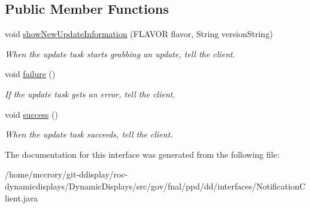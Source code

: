 \subsection*{Public Member Functions}
\begin{DoxyCompactItemize}
\item 
\hypertarget{interfacegov_1_1fnal_1_1ppd_1_1dd_1_1interfaces_1_1NotificationClient_ab0cf3325fec8142ebfe7babe9a6dcd41}{void \hyperlink{interfacegov_1_1fnal_1_1ppd_1_1dd_1_1interfaces_1_1NotificationClient_ab0cf3325fec8142ebfe7babe9a6dcd41}{show\-New\-Update\-Information} (F\-L\-A\-V\-O\-R flavor, String version\-String)}\label{interfacegov_1_1fnal_1_1ppd_1_1dd_1_1interfaces_1_1NotificationClient_ab0cf3325fec8142ebfe7babe9a6dcd41}

\begin{DoxyCompactList}\small\item\em When the update task starts grabbing an update, tell the client. \end{DoxyCompactList}\item 
\hypertarget{interfacegov_1_1fnal_1_1ppd_1_1dd_1_1interfaces_1_1NotificationClient_a4f3a03aacbff763583e515a1bcdb4d66}{void \hyperlink{interfacegov_1_1fnal_1_1ppd_1_1dd_1_1interfaces_1_1NotificationClient_a4f3a03aacbff763583e515a1bcdb4d66}{failure} ()}\label{interfacegov_1_1fnal_1_1ppd_1_1dd_1_1interfaces_1_1NotificationClient_a4f3a03aacbff763583e515a1bcdb4d66}

\begin{DoxyCompactList}\small\item\em If the update task gets an error, tell the client. \end{DoxyCompactList}\item 
\hypertarget{interfacegov_1_1fnal_1_1ppd_1_1dd_1_1interfaces_1_1NotificationClient_a6aa9aea7f841d3b3af77302d32aa2197}{void \hyperlink{interfacegov_1_1fnal_1_1ppd_1_1dd_1_1interfaces_1_1NotificationClient_a6aa9aea7f841d3b3af77302d32aa2197}{success} ()}\label{interfacegov_1_1fnal_1_1ppd_1_1dd_1_1interfaces_1_1NotificationClient_a6aa9aea7f841d3b3af77302d32aa2197}

\begin{DoxyCompactList}\small\item\em When the update task succeeds, tell the client. \end{DoxyCompactList}\end{DoxyCompactItemize}


The documentation for this interface was generated from the following file\-:\begin{DoxyCompactItemize}
\item 
/home/mccrory/git-\/ddisplay/roc-\/dynamicdisplays/\-Dynamic\-Displays/src/gov/fnal/ppd/dd/interfaces/Notification\-Client.\-java\end{DoxyCompactItemize}
